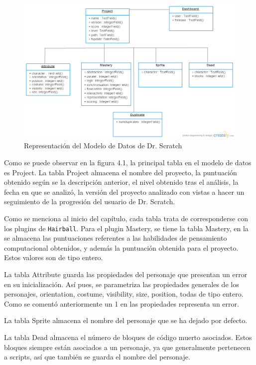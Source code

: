 \documentclass[a4paper, 12pt]{book}
\begin{document}
 \begin{figure}
    \centering
		\graphicspath{{img/}}
    \includegraphics[bb=0 0 800 600, width=12cm, keepaspectratio]{modelo.png}
    \caption{Representación del Modelo de Datos de Dr. Scratch}
    \label{figura:foro_hilos}
 \end{figure}


Como se puede observar en la figura 4.1, la principal tabla en el modelo de datos
es Project. La tabla Project almacena el nombre del proyecto, la puntuación obtenido
según se la descripción anterior, el nivel obtenido tras el análisis, la fecha en
que se analizó, la versión del proyecto analizado con vistas a hacer un seguimiento
de la progresión del usuario de Dr. Scratch.

Como se menciona al inicio del capítulo, cada tabla trata de corresponderse con los
plugins de \texttt{Hairball}. Para el plugin Mastery, se tiene la tabla Mastery, en
la se almacena las puntuaciones referentes a las habilidades de pensamiento 
computacional obtenidos, y además la puntuación obtenida para el proyecto. Estos 
valores son de tipo entero.

La tabla Attribute guarda las propiedades del personaje que presentan un error en su 
inicialización. Así pues, se parametriza las propiedades generales de los personajes,
orientation, costume, visibility, size, position, todas de tipo entero. Como se 
comentó anteriormente un 1 en las propiedades representa un error.

La tabla Sprite almacena el nombre del personaje que se ha dejado por defecto.

La tabla Dead almacena el número de bloques de código muerto asociados. Estos bloques
siempre están asociados a un personaje, ya que generalmente pertenecen a scripts, así
que también se guarda el nombre del personaje.
\end{document}
